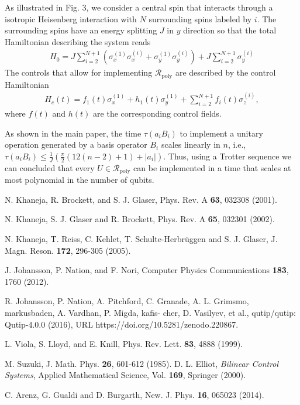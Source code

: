 \documentclass[aps,twocolumn,amsmath,amssymb,nofootinbib,superscriptaddress]{revtex4-1}
\begin{document}
As illustrated in Fig. 3, we consider a central spin that interacts through a isotropic Heisenberg interaction with $N$ surrounding spins labeled by $i$. The surrounding spins have an energy splitting $J$ in $y$ direction so that the total Hamiltonian describing the system reads  
\begin{align}
\label{eq:driftStar}
H_{0}=J\sum_{i=2}^{N+1}(\sigma_{x}^{(1)}\sigma_{x}^{(i)}+\sigma_{y}^{(1)}\sigma_{y}^{(i)})+J\sum_{i=2}^{N+1}\sigma_{y}^{(i)}
\end{align}
The controls that allow for implementing $\mathcal R_{\text{poly}}$ are described by the control Hamiltonian 
\begin{align}
\label{eq:controlHStar}
H_{c}(t)=f_{1}(t)\sigma_{x}^{(1)}+h_{1}(t)\sigma_{y}^{(1)}+\sum_{i=2}^{N+1}f_{i}(t)\sigma_{z}^{(i)},
\end{align}
where $f(t)$ and $h(t)$ are the corresponding control fields.   

As shown in the main paper, the time $\tau(a_{i}B_{i})$ to implement a unitary operation generated by a basis operator $B_{i}$ scales linearly in $n$, i.e., $\tau(a_{i}B_{i})\leq \frac{1}{J}\left(\frac{\pi}{2}(12(n-2)+1)+|a_{i}|  \right)$. Thus, using a Trotter sequence we can concluded that every $U\in\mathcal R_{\text{poly}}$ can be implemented in a time that scales at most polynomial in the number of qubits. 








 \begin{thebibliography}{99}
 
 
 N. Khaneja, R. Brockett, and S. J. Glaser, Phys. Rev. A \textbf{63}, 032308 (2001). 

 N. Khaneja, S. J. Glaser and R. Brockett, Phys. Rev. A \textbf{65}, 032301 (2002). 

 N. Khaneja, T. Reiss, C.
Kehlet, T. Schulte-Herbr\"uggen and S. J. Glaser, J. Magn. Reson.
\textbf{172}, 296-305 (2005).

 J. Johansson, P. Nation, and F. Nori, Computer Physics
Communications \textbf{183}, 1760 (2012).

 R. Johansson, P. Nation, A. Pitchford, C. Granade, A. L.
Grimsmo, markusbaden, A. Vardhan, P. Migda, kafis- cher, D. Vasilyev, et al., qutip/qutip: Qutip-4.0.0 (2016), URL https://doi.org/10.5281/zenodo.220867.
 
 
 L. Viola, S. Lloyd, and E. Knill, Phys. Rev. Lett. \textbf{83}, 4888 (1999). 

 M. Suzuki, J. Math. Phys. \textbf{26}, 601-612 (1985).
 D. L. Elliot,
\textit{Bilinear Control Systems}, Applied Mathematical Science, Vol. \textbf{169}, Springer (2000). 


 C. Arenz, G. Gualdi and D. Burgarth, New. J. Phys. \textbf{16}, 065023 (2014).




%
\end{thebibliography}



 
\end{document}
